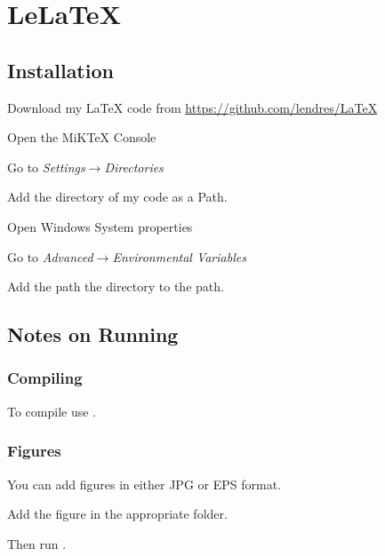 \chapter{LeLaTeX}
\section{Installation}
\begin{numberedlist}
	\item Download my LaTeX code from \url{https://github.com/lendres/LaTeX}
	\item Open the MiKTeX Console
	\item Go to \emph{Settings$\rightarrow$Directories}
	\item Add the directory of my code as a Path.
	\item Open Windows System properties
	\item Go to \emph{Advanced$\rightarrow$Environmental Variables}
	\item Add the path the  directory to the path.
\end{numberedlist}


\section{Notes on Running}
\subsection{Compiling}
\begin{bulletedlist}
	\item To compile use .
\end{bulletedlist}

\subsection{Figures}
You can add figures in either JPG or EPS format.
\begin{numberedlist}
	\item Add the figure in the appropriate folder.
	\begin{plainlist}
		\item {}
		\item {}
	\end{plainlist}
	\item Then run .
\end{numberedlist}